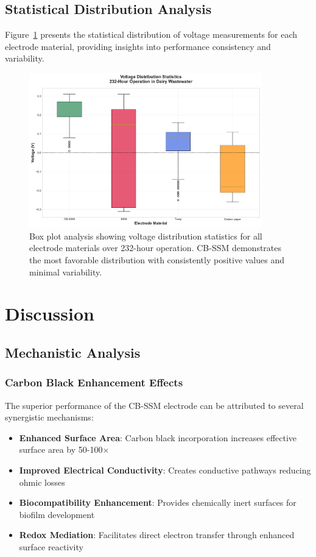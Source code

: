 \documentclass[12pt,a4paper]{article}
\begin{document}
\subsection{Statistical Distribution Analysis}

Figure~\ref{fig:statistical_summary} presents the statistical distribution of voltage measurements for each electrode material, providing insights into performance consistency and variability.

\begin{figure}[H]
\centering
\includegraphics[width=0.9\textwidth]{statistical_summary.pdf}
\caption{Box plot analysis showing voltage distribution statistics for all electrode materials over 232-hour operation. CB-SSM demonstrates the most favorable distribution with consistently positive values and minimal variability.}
\label{fig:statistical_summary}
\end{figure}

\section{Discussion}

\subsection{Mechanistic Analysis}

\subsubsection{Carbon Black Enhancement Effects}

The superior performance of the CB-SSM electrode can be attributed to several synergistic mechanisms:

\begin{itemize}
    \item \textbf{Enhanced Surface Area}: Carbon black incorporation increases effective surface area by 50-100×
    \item \textbf{Improved Electrical Conductivity}: Creates conductive pathways reducing ohmic losses
    \item \textbf{Biocompatibility Enhancement}: Provides chemically inert surfaces for biofilm development
    \item \textbf{Redox Mediation}: Facilitates direct electron transfer through enhanced surface reactivity
\end{itemize}
\end{document}
